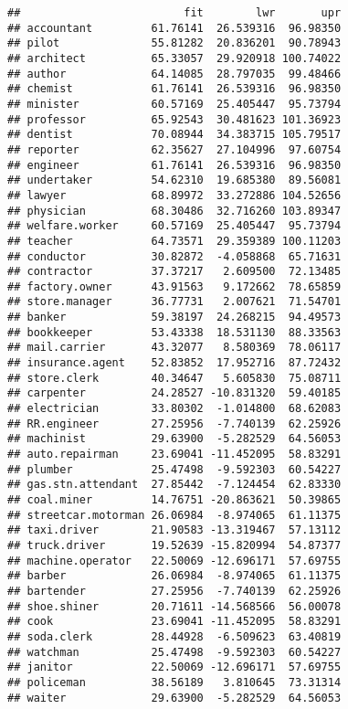 \documentclass[
]{article}
\begin{document}
\begin{verbatim}
##                         fit        lwr       upr
## accountant         61.76141  26.539316  96.98350
## pilot              55.81282  20.836201  90.78943
## architect          65.33057  29.920918 100.74022
## author             64.14085  28.797035  99.48466
## chemist            61.76141  26.539316  96.98350
## minister           60.57169  25.405447  95.73794
## professor          65.92543  30.481623 101.36923
## dentist            70.08944  34.383715 105.79517
## reporter           62.35627  27.104996  97.60754
## engineer           61.76141  26.539316  96.98350
## undertaker         54.62310  19.685380  89.56081
## lawyer             68.89972  33.272886 104.52656
## physician          68.30486  32.716260 103.89347
## welfare.worker     60.57169  25.405447  95.73794
## teacher            64.73571  29.359389 100.11203
## conductor          30.82872  -4.058868  65.71631
## contractor         37.37217   2.609500  72.13485
## factory.owner      43.91563   9.172662  78.65859
## store.manager      36.77731   2.007621  71.54701
## banker             59.38197  24.268215  94.49573
## bookkeeper         53.43338  18.531130  88.33563
## mail.carrier       43.32077   8.580369  78.06117
## insurance.agent    52.83852  17.952716  87.72432
## store.clerk        40.34647   5.605830  75.08711
## carpenter          24.28527 -10.831320  59.40185
## electrician        33.80302  -1.014800  68.62083
## RR.engineer        27.25956  -7.740139  62.25926
## machinist          29.63900  -5.282529  64.56053
## auto.repairman     23.69041 -11.452095  58.83291
## plumber            25.47498  -9.592303  60.54227
## gas.stn.attendant  27.85442  -7.124454  62.83330
## coal.miner         14.76751 -20.863621  50.39865
## streetcar.motorman 26.06984  -8.974065  61.11375
## taxi.driver        21.90583 -13.319467  57.13112
## truck.driver       19.52639 -15.820994  54.87377
## machine.operator   22.50069 -12.696171  57.69755
## barber             26.06984  -8.974065  61.11375
## bartender          27.25956  -7.740139  62.25926
## shoe.shiner        20.71611 -14.568566  56.00078
## cook               23.69041 -11.452095  58.83291
## soda.clerk         28.44928  -6.509623  63.40819
## watchman           25.47498  -9.592303  60.54227
## janitor            22.50069 -12.696171  57.69755
## policeman          38.56189   3.810645  73.31314
## waiter             29.63900  -5.282529  64.56053
\end{verbatim}
\end{document}
